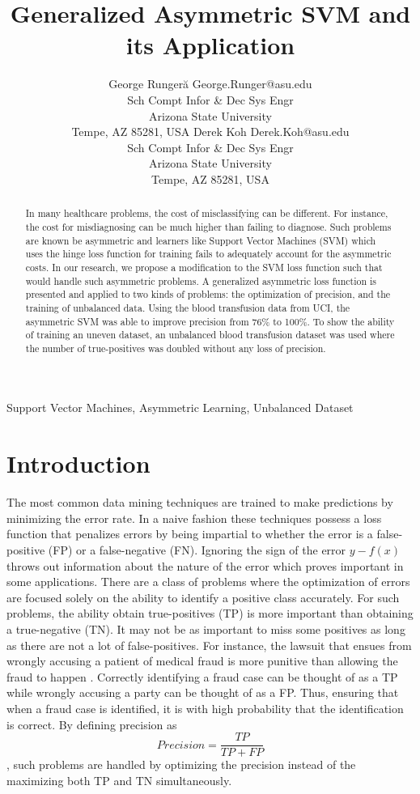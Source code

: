 \documentclass[twoside,11pt]{article}
\title{Generalized Asymmetric SVM and its Application}
\author{\name George Runger\u{a} \email George.Runger@asu.edu\\
       \addr Sch Compt Infor \& Dec Sys Engr\\
       Arizona State University\\
       Tempe, AZ 85281, USA
       \AND
       \name Derek Koh \email Derek.Koh@asu.edu \\
       \addr Sch Compt Infor \& Dec Sys Engr\\
       Arizona State University\\
       Tempe, AZ 85281, USA}
\begin{document}
\maketitle
\begin{abstract}\label{Abstract}
In many healthcare problems, the cost of misclassifying can be different. For instance, the cost for misdiagnosing can be much higher than failing to diagnose. Such problems are known be asymmetric and learners like Support Vector Machines (SVM) which uses the hinge loss function for training fails to adequately account for the asymmetric costs. In our research, we propose a modification to the SVM loss function such that would handle such asymmetric problems. A generalized asymmetric loss function is presented and applied to two kinds of problems: the optimization of precision, and the training of unbalanced data. Using the blood transfusion data from UCI, the asymmetric SVM was able to improve precision from 76\% to 100\%. To show the ability of training an uneven dataset, an unbalanced blood transfusion dataset was used where the number of true-positives was doubled without any loss of precision.
\end{abstract}

\begin{keywords}
  Support Vector Machines, Asymmetric Learning, Unbalanced Dataset
\end{keywords}

\section{Introduction}\label{Introduction}

The most common data mining techniques are trained to make predictions by minimizing the error rate. In a naive fashion these techniques possess a loss function that penalizes errors by being impartial to whether the error is a false-positive (FP) or a false-negative (FN). Ignoring the sign of the error $y-f(x)$ throws out information about the nature of the error which proves important in some applications. There are a class of problems where the optimization of errors are focused solely on the ability to identify a positive class accurately. For such problems, the ability obtain true-positives (TP) is more important than obtaining a true-negative (TN). It may not be as important to miss some positives as long as there are not a lot of false-positives. For instance, the lawsuit that ensues from wrongly accusing a patient of medical fraud is more punitive than allowing the fraud to happen \citep{Liou08}. Correctly identifying a fraud case can be thought of as a TP while wrongly accusing a party can be thought of as a FP. Thus, ensuring that when a fraud case is identified, it is with high probability that the identification is correct. By defining precision as
 \begin{equation} \label{Eq:precision}
Precision=\frac{TP}{TP+FP}
\end{equation}
, such problems are handled by optimizing the precision instead of the maximizing both TP and TN simultaneously. 
\end{document}
